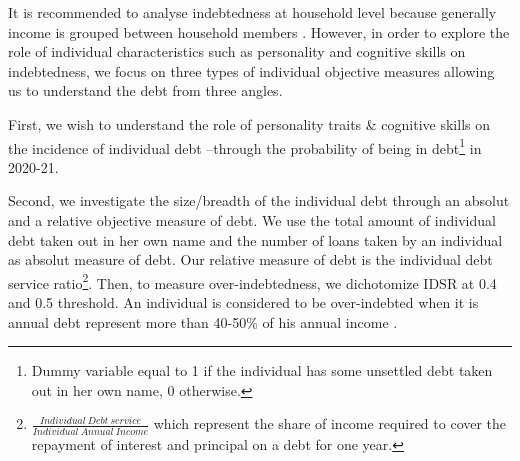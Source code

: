 \documentclass[a4paper, 11pt, onecolumn]{article}
\begin{document}
It is recommended to analyse indebtedness at household level because generally income is grouped between household members \citep{European2010}.
However, in order to explore the role of individual characteristics such as personality and cognitive skills on indebtedness, we focus on three types of individual objective measures allowing us to understand the debt from three angles.

First, we wish to understand the role of personality traits \& cognitive skills on the incidence of individual debt --through the probability of being in debt\footnote{Dummy variable equal to 1 if the individual has some unsettled debt taken out in her own name, 0 otherwise.} in 2020-21.

Second, we investigate the size/breadth of the individual debt through an absolut and a relative objective measure of debt. 
We use the total amount of individual debt taken out in her own name and the number of loans taken by an individual as absolut measure of debt.
Our relative measure of debt is the individual debt service ratio\footnote{$\frac{Individual~Debt~service}{Individual~Annual~Income}$ which represent the share of income required to cover the repayment of interest and principal on a debt for one year.}.
Then, to measure over-indebtedness, we dichotomize IDSR at 0.4 and 0.5 threshold.
An individual is considered to be over-indebted when it is annual debt represent more than 40-50\% of his annual income \citep{Chichaibelu2017, DAlessio2013}.


\end{document}
